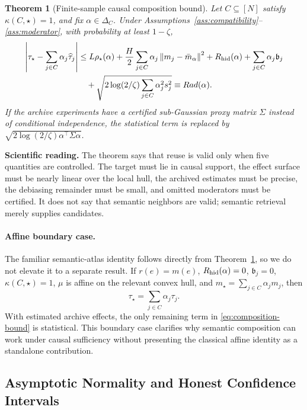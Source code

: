 \documentclass[11pt]{article}
\numberwithin{equation}{section}
\newtheorem{theorem}{Theorem}[section]
\newcommand{\1}{\mathbf 1}
\newcommand{\norm}[1]{\left\lVert #1\right\rVert}
\newcommand{\abs}[1]{\left\lvert #1\right\rvert}
\begin{document}
\begin{theorem}[Finite-sample causal composition bound]
\label{thm:composition}
Let \(C\subseteq[N]\) satisfy \(\kappa(C,\star)=1\), and fix \(\alpha\in\Delta_C\).  Under Assumptions~\ref{ass:compatibility}--\ref{ass:moderator}, with probability at least \(1-\zeta\),
\begin{equation}
\label{eq:composition-bound}
\begin{aligned}
\abs{\tau_\star-\sum_{j\in C}\alpha_j\widehat\tau_j}
&\le
L\rho_\star(\alpha)
+\frac{H}{2}\sum_{j\in C}\alpha_j\norm{m_j-\bar m_\alpha}^2
+R_{\rm hid}(\alpha)
+\sum_{j\in C}\alpha_j\mathfrak b_j \\
&\quad
+\sqrt{2\log(2/\zeta)\sum_{j\in C}\alpha_j^2s_j^2}
\equiv Rad(\alpha).
\end{aligned}
\end{equation}
If the archive experiments have a certified sub-Gaussian proxy matrix \(\Sigma\) instead of conditional independence, the statistical term is replaced by \(\sqrt{2\log(2/\zeta)\alpha^\top\Sigma\alpha}\).
\end{theorem}

\noindent\textbf{Scientific reading.}
The theorem says that reuse is valid only when five quantities are controlled.  The target must lie in causal support, the effect surface must be nearly linear over the local hull, the archived estimates must be precise, the debiasing remainder must be small, and omitted moderators must be certified.  It does not say that semantic neighbors are valid; semantic retrieval merely supplies candidates.

\paragraph{Affine boundary case.}
The familiar semantic-atlas identity follows directly from
Theorem~\ref{thm:composition}, so we do not elevate it to a separate result.
If \(r(e)=m(e)\), \(R_{\rm hid}(\alpha)=0\), \(\mathfrak b_j=0\),
\(\kappa(C,\star)=1\), \(\mu\) is affine on the relevant convex hull, and
\(m_\star=\sum_{j\in C}\alpha_jm_j\), then
\[
  \tau_\star=\sum_{j\in C}\alpha_j\tau_j.
\]
With estimated archive effects, the only remaining term in
\eqref{eq:composition-bound} is statistical.  This boundary case clarifies
why semantic composition can work under causal sufficiency without presenting
the classical affine identity as a standalone contribution.

\subsection{Asymptotic Normality and Honest Confidence Intervals}
\end{document}
